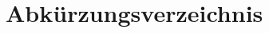 \documentclass[12pt,twocolumn]{scrartcl}
\newcommand{\head}[1] {
 	\lhead{\ifthispageodd{}{#1}}
 	\rhead{\ifthispageodd{#1}{}}
 }
\newcommand{\headAndToc}[1] {
	\head{#1}
	\addcontentsline{toc}{section}{#1}
}
\newcommand{\headAndTocENDE}[2] {
	\headAndToc{#2}
}
\begin{document}
\section*{Abk{\"u}rzungsverzeichnis}
\begin{acronym}[Internship]

\end{acronym} 
{}
\listoffigures

\listoftables 

\lstlistoflistings
\clearpage
 
% 
\end{document}
